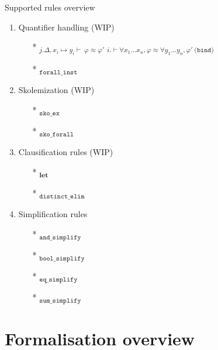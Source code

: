 \documentclass[aspectratio=169,xcolor={dvipsnames}]{beamer}
\begin{document}
\begin{frame}[t]{Supported rules overview}
\begin{multicols}{2}
\begin{enumerate}
            \item Quantifier handling (WIP)
            \begin{itemize}
                \item[*] \textsubscript{$j.  \Delta, x_i \mapsto y_i \vdash~ \varphi \approx \varphi'$}
                    \newline \textsubscript{$i. \vdash  \forall x_1 \dots x_n, \varphi \approx \forall y_1 \dots y_n, \varphi' ~\texttt{(bind)}$}
                \item[*] \textsubscript{$\texttt{forall\_inst}$}
            \end{itemize}
            \item Skolemization (WIP)
            \begin{itemize}
                \item[*] \textsubscript{$\texttt{sko\_ex}$}
                \item[*] \textsubscript{$\texttt{sko\_forall}$}
            \end{itemize}
            \item Clausification rules (WIP)
            \begin{itemize}
                \item[*] \textsubscript{$\textbf{let}$}
                \item[*] \textsubscript{$\texttt{distinct\_elim}$}
            \end{itemize}

            \item Simplification rules \texttimes
            \begin{itemize}
                \item[*] \textsubscript{$\texttt{and\_simplify}$}
                \item[*] \textsubscript{$\texttt{bool\_simplify}$}
                \item[*] \textsubscript{$\texttt{eq\_simplify}$}
                \item[*] \textsubscript{$\texttt{sum\_simplify}$}
            \end{itemize}
        \end{enumerate}
    \end{multicols}
\end{frame}


\section{Formalisation overview}
\end{document}
